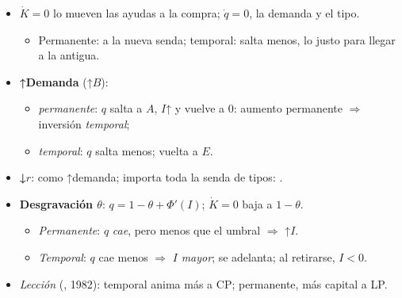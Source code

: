 \documentclass{article}
\begin{document}
\begin{columnas}
\begin{itemize}
\item $\dot K=0$ lo mueven las ayudas a la compra; $\dot q=0$, la demanda y el tipo.
  \begin{itemize}
  \item Permanente: a la nueva senda; temporal: salta menos, lo justo para llegar a la antigua.
  \end{itemize}
\item \textbf{↑Demanda} (↑$B$):
  \begin{itemize}
  \item \emph{permanente}: $q$ salta a $A$, $I$↑ y vuelve a 0: aumento permanente $\Rightarrow$ inversión \emph{temporal};
  \item \emph{temporal}: $q$ salta menos; vuelta a $E$.
  \end{itemize}
\item \textbf{↓$r$}: como ↑demanda; importa toda la senda de tipos:  .
\end{itemize}
\begin{itemize}
\item \textbf{Desgravación $\theta$}: $q=1-\theta+\Phi'({I})$; $\dot K=0$ baja a $1-\theta$.
  \begin{itemize}
  \item \emph{Permanente}: $q$ \emph{cae}, pero menos que el umbral $\Rightarrow$ ↑$I$.
  \item \emph{Temporal}: $q$ cae menos $\Rightarrow$ $I$ \emph{mayor}; se adelanta; al retirarse, $I<0$.
  \end{itemize}
\item \emph{Lección} (, 1982): temporal anima más a CP; permanente, más capital a LP.
\end{itemize}


\end{columnas}
\end{document}
